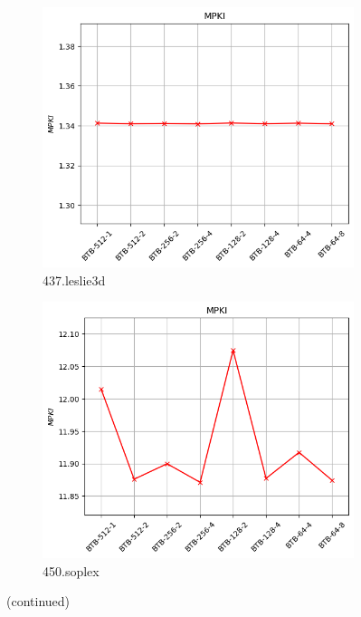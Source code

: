 \documentclass{article}
\begin{document}
\begin{figure}[H]
    \vspace{0.5cm} %

    \begin{subfigure}[b]{0.45\textwidth}
        \includegraphics[width=\textwidth]{figures/5_4/437.leslie3d.cslab_branch_preds_ref.out.png}
        \caption{437.leslie3d}
        \label{fig:plot57}
    \end{subfigure}
    \hfill
    \begin{subfigure}[b]{0.45\textwidth}
        \includegraphics[width=\textwidth]{figures/5_4/450.soplex.cslab_branch_preds_ref.out.png}
        \caption{450.soplex}
        \label{fig:plot58}
    \end{subfigure}
    
    \vspace{0.5cm} %

    \caption{(continued)}
    \label{fig:btb_part2}
\end{figure}
\end{document}
